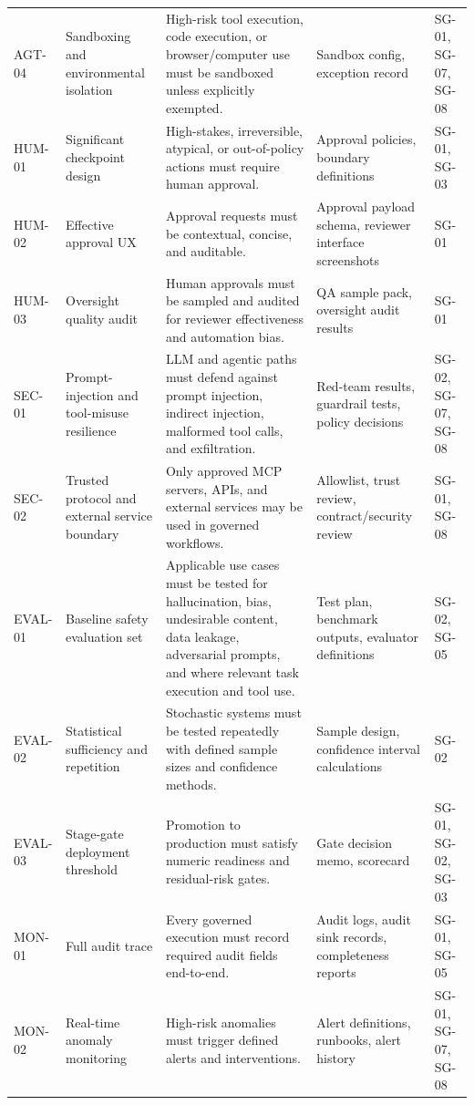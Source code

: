 \documentclass[11pt,a4paper]{article}
\begin{document}
\begin{longtable}{P{0.10\textwidth}P{0.21\textwidth}P{0.23\textwidth}P{0.18\textwidth}P{0.18\textwidth}}
AGT-04 & Sandboxing and environmental isolation & High-risk tool execution, code execution, or browser/computer use must be sandboxed unless explicitly exempted. & Sandbox config, exception record & SG-01, SG-07, SG-08 \\
HUM-01 & Significant checkpoint design & High-stakes, irreversible, atypical, or out-of-policy actions must require human approval. & Approval policies, boundary definitions & SG-01, SG-03 \\
HUM-02 & Effective approval UX & Approval requests must be contextual, concise, and auditable. & Approval payload schema, reviewer interface screenshots & SG-01 \\
HUM-03 & Oversight quality audit & Human approvals must be sampled and audited for reviewer effectiveness and automation bias. & QA sample pack, oversight audit results & SG-01 \\
SEC-01 & Prompt-injection and tool-misuse resilience & LLM and agentic paths must defend against prompt injection, indirect injection, malformed tool calls, and exfiltration. & Red-team results, guardrail tests, policy decisions & SG-02, SG-07, SG-08 \\
SEC-02 & Trusted protocol and external service boundary & Only approved MCP servers, APIs, and external services may be used in governed workflows. & Allowlist, trust review, contract/security review & SG-01, SG-08 \\
EVAL-01 & Baseline safety evaluation set & Applicable use cases must be tested for hallucination, bias, undesirable content, data leakage, adversarial prompts, and where relevant task execution and tool use. & Test plan, benchmark outputs, evaluator definitions & SG-02, SG-05 \\
EVAL-02 & Statistical sufficiency and repetition & Stochastic systems must be tested repeatedly with defined sample sizes and confidence methods. & Sample design, confidence interval calculations & SG-02 \\
EVAL-03 & Stage-gate deployment threshold & Promotion to production must satisfy numeric readiness and residual-risk gates. & Gate decision memo, scorecard & SG-01, SG-02, SG-03 \\
MON-01 & Full audit trace & Every governed execution must record required audit fields end-to-end. & Audit logs, audit sink records, completeness reports & SG-01, SG-05 \\
MON-02 & Real-time anomaly monitoring & High-risk anomalies must trigger defined alerts and interventions. & Alert definitions, runbooks, alert history & SG-01, SG-07, SG-08 \\

\end{longtable}
\end{document}
